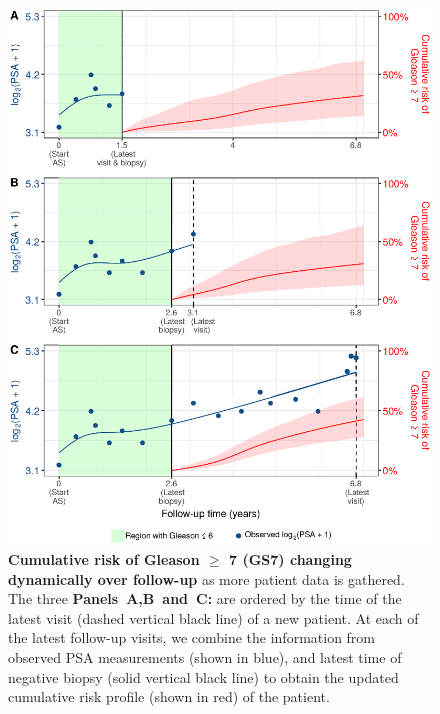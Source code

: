 \begin{figure}
\centerline{\includegraphics[width=\columnwidth]{images/dynrisk_plot_102.eps}}
\caption{\textbf{Cumulative risk of Gleason $\geq$ 7 (GS7) changing dynamically over follow-up} as more patient data is gathered. The three \textbf{Panels~A,B~and~C:} are ordered by the time of the latest visit (dashed vertical black line) of a new patient. At each of the latest follow-up visits, we combine the information from observed PSA measurements (shown in blue), and latest time of negative biopsy (solid vertical black line) to obtain the updated cumulative risk profile (shown in red) of the patient.}
\label{fig:dynrisk_plot_102}
\end{figure}

